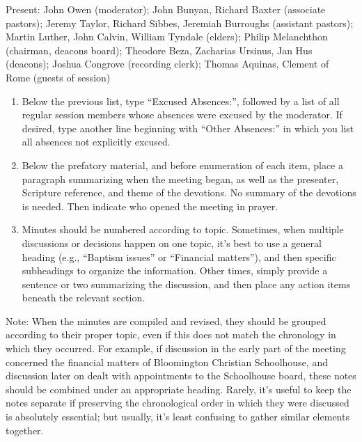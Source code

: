 \documentclass[
]{book}
\begin{document}
Present: John Owen (moderator); John Bunyan, Richard Baxter (associate pastors); Jeremy Taylor, Richard Sibbes, Jeremiah Burroughs (assistant pastors); Martin Luther, John Calvin, William Tyndale (elders); Philip Melanchthon (chairman, deacons board); Theodore Beza, Zacharias Ursinus, Jan Hus (deacons); Joshua Congrove (recording clerk); Thomas Aquinas, Clement of Rome (guests of session)

\begin{enumerate}
\def\labelenumi{\arabic{enumi}.}
\setcounter{enumi}{3}
\item
  Below the previous list, type ``Excused Absences:'', followed by a list of all regular session members whose absences were excused by the moderator. If desired, type another line beginning with ``Other Absences:'' in which you list all absences not explicitly excused.
\item
  Below the prefatory material, and before enumeration of each item, place a paragraph summarizing when the meeting began, as well as the presenter, Scripture reference, and theme of the devotions. No summary of the devotions is needed. Then indicate who opened the meeting in prayer.
\item
  Minutes should be numbered according to topic. Sometimes, when multiple discussions or decisions happen on one topic, it's best to use a general heading (e.g., ``Baptism issues'' or ``Financial matters''), and then specific subheadings to organize the information. Other times, simply provide a sentence or two summarizing the discussion, and then place any action items beneath the relevant section.
\end{enumerate}

Note: When the minutes are compiled and revised, they should be grouped according to their proper topic, even if this does not match the chronology in which they occurred. For example, if discussion in the early part of the meeting concerned the financial matters of Bloomington Christian Schoolhouse, and discussion later on dealt with appointments to the Schoolhouse board, these notes should be combined under an appropriate heading. Rarely, it's useful to keep the notes separate if preserving the chronological order in which they were discussed is absolutely essential; but usually, it's least confusing to gather similar elements together.
\end{document}

